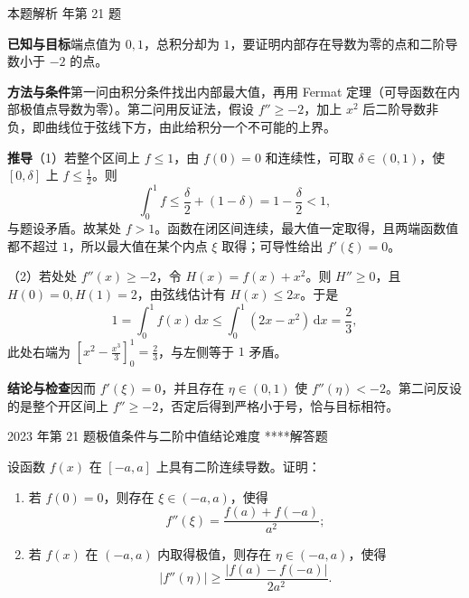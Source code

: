 \documentclass[UTF8,zihao=-4,fontset=fandol]{ctexart}
\newcounter{BankQuestion}
\newcommand{\QuestionPage}[7]{%
  \stepcounter{BankQuestion}%
  \par\noindent\begin{minipage}{\linewidth}
  \raggedright
  {\small\textcolor{black!60}{#3\quad #5\quad 难度 #7}\hfill\textcolor{accent}{#2}}\par\smallskip}
\newcommand{\QuestionEnd}{\end{minipage}\par\medskip}
\newcommand{\QuestionPage}[7]{%
  \clearpage
  \stepcounter{BankQuestion}%
  {\small\textcolor{accent}{#1\hfill #2}}\par\medskip
  {\small\textcolor{black!60}{#3\quad #5\quad 难度 #7\hfill \arabic{BankQuestion} / 234}}\par\vspace{9bp}}
\newcommand{\QuestionEnd}{}
\newenvironment{QuestionSolution}[1]{%
  \clearpage
  {\small\textcolor{black!60}{本题解析\quad #1}}\par\medskip
}{\par\clearpage}
\begin{document}
\begin{QuestionSolution}{2019 年第 21 题}
\textbf{已知与目标}\quad 端点值为 \(0,1\)，总积分却为 \(1\)，要证明内部存在导数为零的点和二阶导数小于 \(-2\) 的点。

\textbf{方法与条件}\quad 第一问由积分条件找出内部最大值，再用 Fermat 定理（可导函数在内部极值点导数为零）。第二问用反证法，假设 \(f''\ge-2\)，加上 \(x^2\) 后二阶导数非负，即曲线位于弦线下方，由此给积分一个不可能的上界。

\textbf{推导}\quad （1）若整个区间上 \(f\le1\)，由 \(f(0)=0\) 和连续性，可取 \(\delta\in(0,1)\)，使 \([0,\delta]\) 上 \(f\le\frac12\)。则
\[\int_0^1 f\le\frac\delta2+(1-\delta)=1-\frac\delta2<1,\]
与题设矛盾。故某处 \(f>1\)。函数在闭区间连续，最大值一定取得，且两端函数值都不超过 \(1\)，所以最大值在某个内点 \(\xi\) 取得；可导性给出 \(f'(\xi)=0\)。

（2）若处处 \(f''(x)\ge-2\)，令 \(H(x)=f(x)+x^2\)。则 \(H''\ge0\)，且 \(H(0)=0,H(1)=2\)，由弦线估计有 \(H(x)\le2x\)。于是
\[
1=\int_0^1 f(x)\,\mathrm{d}x\le\int_0^1(2x-x^2)\,\mathrm{d}x=\frac23,
\]
此处右端为 \([x^2-\frac{x^3}{3}]_0^1=\frac23\)，与左侧等于 \(1\) 矛盾。

\textbf{结论与检查}\quad 因而 \(\boxed{f'(\xi)=0}\)，并且存在 \(\eta\in(0,1)\) 使 \(\boxed{f''(\eta)<-2}\)。第二问反设的是整个开区间上 \(f''\ge-2\)，否定后得到严格小于号，恰与目标相符。
\end{QuestionSolution}

\QuestionPage{2.4 微分中值定理及其应用}{解答题}{2023 年第 21 题}{4}{极值条件与二阶中值结论}{094 / 234}{****}
设函数 \(f(x)\) 在 \([-a,a]\) 上具有二阶连续导数。证明：
\begin{enumerate}
\item 若 \(f(0)=0\)，则存在 \(\xi\in(-a,a)\)，使得
\[f''(\xi)=\frac{f(a)+f(-a)}{a^2};
\]
\item 若 \(f(x)\) 在 \((-a,a)\) 内取得极值，则存在 \(\eta\in(-a,a)\)，使得
\[|f''(\eta)|\ge \frac{|f(a)-f(-a)|}{2a^2}.
\]
\end{enumerate}
\QuestionEnd
\end{document}
